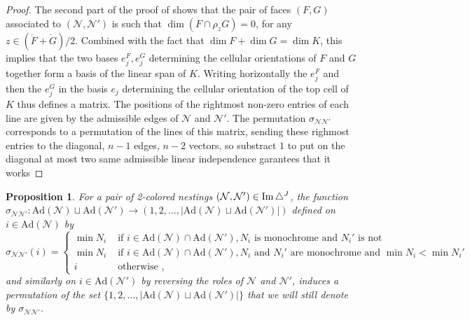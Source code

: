 \documentclass[twoside, 12pt]{amsart}
\newtheorem{proposition}[definition]{Proposition}
\theoremstyle{remark}
\begin{document}
\begin{proof}
  The second part of the proof of \cite[Theorem 1.26]{LA21} shows that the pair of faces $(F,G)$ associated to $(\mathcal{N},\mathcal{N}')$ is such that $\dim(F\cap \rho_z G)=0$, for any $z \in (\mathring F+ \mathring G)/2$.
  Combined with the fact that $\dim F + \dim G = \dim K$, this implies that the two bases $e_j^F, e_j^G$ determining the cellular orientations of $F$ and $G$ together form a basis of the linear span of $K$. 
  Writing horizontally the $e_j^F$ and then the $e_j^G$ in the basis $e_j$ determining the cellular orientation of the top cell of $K$ thus defines a matrix.
  The positions of the rightmost non-zero entries of each line are given by the admissible edges of $\mathcal{N}$ and $\mathcal{N}'$.
  The permutation $\sigma_{\mathcal{N}\mathcal{N}'}$ corresponds to a permutation of the lines of this matrix, sending these righmost entries to the diagonal, 
  $n-1$ edges, $n-2$ vectors, so substract $1$ to put on the diagonal
  at most two same admissible
  linear independence garantees that it works
\end{proof}

\begin{proposition} 
\label{prop:signs-mul}
For a pair of 2-colored nestings  $(\mathcal{N},\mathcal{N}')\in \operatorname{Im}\triangle^J$, the function $\sigma_{\mathcal{N}\mathcal{N}'}: \mathrm{Ad}(\mathcal{N})\sqcup \mathrm{Ad}(\mathcal{N}') \to (1,2,\ldots,|\mathrm{Ad}(\mathcal{N})\sqcup \mathrm{Ad}(\mathcal{N}')|)$ defined on $i \in \mathrm{Ad}(\mathcal{N})$ by 
\begin{equation*}
  \sigma_{\mathcal{N}\mathcal{N}'}(i)= 
  \begin{cases}
    \min N_i & \text{ if } i \in \mathrm{Ad}(\mathcal{N})\cap \mathrm{Ad}(\mathcal{N}') , N_i \text{ is monochrome and } N_i' \text{ is not} \\
    \min N_i & \text{ if } i \in \mathrm{Ad}(\mathcal{N})\cap \mathrm{Ad}(\mathcal{N}'), N_i \text{ and } N_i' \text{ are monochrome and } \min N_i < \min N_i' \\ 
    i & \text{ otherwise ,} 
  \end{cases}
\end{equation*}
and similarly on $i \in \mathrm{Ad}(\mathcal{N}')$ by reversing the roles of $\mathcal{N}$ and $\mathcal{N}'$, induces a permutation of the set $\{1,2,\ldots,|\mathrm{Ad}(\mathcal{N})\sqcup \mathrm{Ad}(\mathcal{N}')|\}$ that we will still denote by $\sigma_{\mathcal{N}\mathcal{N}'}$.
\end{proposition}
\end{document}
